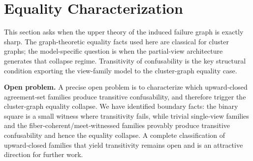 \section{Equality Characterization}\label{sec:equality}


This section asks when the upper theory of the induced failure graph is exactly sharp. The graph-theoretic equality facts used here are classical for cluster graphs; the model-specific question is when the partial-view architecture generates that collapse regime. Transitivity of confusability is the key structural condition exporting the view-family model to the cluster-graph equality case.

\medskip
\noindent\textbf{Open problem.} A precise open problem is to characterize which upward‑closed agreement‑set families produce transitive confusability, and therefore trigger the cluster‑graph equality collapse. We have identified boundary facts: the binary square is a small witness where transitivity fails, while trivial single‑view families and the fiber‑coherent/meet‑witnessed families provably produce transitive confusability and hence the equality collapse. A complete classification of upward‑closed families that yield transitivity remains open and is an attractive direction for further work.

